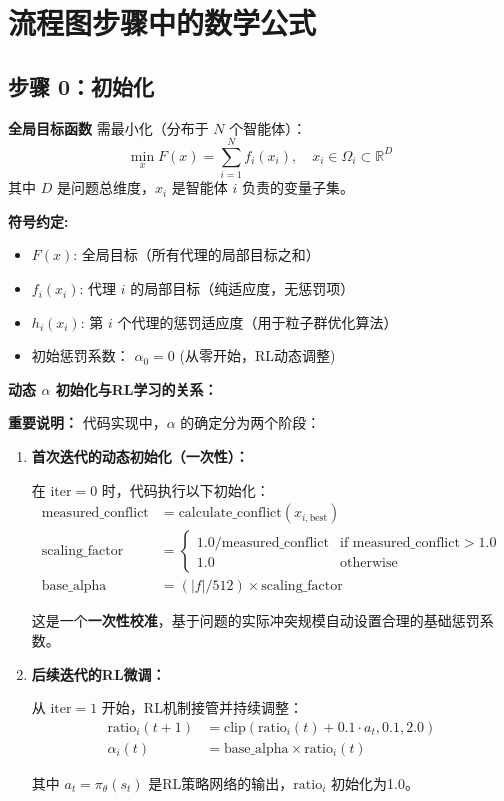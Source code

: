 \documentclass[11pt,a3paper]{ctexart}
\begin{document}
\section{流程图步骤中的数学公式}

\subsection{步骤 0：初始化}
\textbf{全局目标函数} 需最小化（分布于 $N$ 个智能体）：
\begin{equation}
\min_{x} F(x) = \sum_{i=1}^N f_i(x_i), \quad x_i \in \Omega_i \subset \mathbb{R}^{D}
\end{equation}
其中 $D$ 是问题总维度，$x_i$ 是智能体 $i$ 负责的变量子集。

\textbf{符号约定:}
\begin{itemize}
    \item $F(x)$: 全局目标（所有代理的局部目标之和）
    \item $f_i(x_i)$: 代理 $i$ 的局部目标（纯适应度，无惩罚项）
    \item $h_i(x_i)$: 第 $i$ 个代理的惩罚适应度（用于粒子群优化算法）
    \item 初始惩罚系数： $\alpha_0 = 0$ (从零开始，RL动态调整)
\end{itemize}

\textbf{动态 $\alpha$ 初始化与RL学习的关系：}

\textbf{重要说明：} 代码实现中，$\alpha$ 的确定分为两个阶段：

\begin{enumerate}
    \item \textbf{首次迭代的动态初始化（一次性）：}
    
    在 $\text{iter} = 0$ 时，代码执行以下初始化：
    \begin{align}
    \text{measured\_conflict} &= \text{calculate\_conflict}(x_{i,\text{best}}) \\
    \text{scaling\_factor} &= \begin{cases}
    1.0 / \text{measured\_conflict} & \text{if measured\_conflict} > 1.0 \\
    1.0 & \text{otherwise}
    \end{cases} \\
    \text{base\_alpha} &= (|f| / 512) \times \text{scaling\_factor}
    \end{align}
    
    这是一个\textbf{一次性校准}，基于问题的实际冲突规模自动设置合理的基础惩罚系数。
    
    \item \textbf{后续迭代的RL微调：}
    
    从 $\text{iter} = 1$ 开始，RL机制接管并持续调整：
    \begin{align}
    \text{ratio}_i(t+1) &= \text{clip}(\text{ratio}_i(t) + 0.1 \cdot a_t, 0.1, 2.0) \\
    \alpha_i(t) &= \text{base\_alpha} \times \text{ratio}_i(t)
    \end{align}
    
    其中 $a_t = \pi_\theta(s_t)$ 是RL策略网络的输出，$\text{ratio}_i$ 初始化为1.0。
\end{enumerate}
\end{document}
